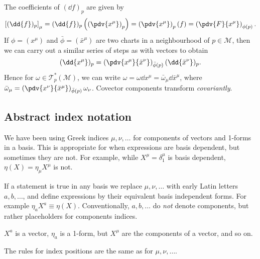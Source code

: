 \documentclass{jknotes}
\begin{document}
The coefficients of \((\dd{f})_p\) are given by
\begin{equation}
    \left[(\dd{f})_p\right]_\mu = (\dd{f})_p\left(\left(\pdv{x^\mu}\right)_p\right) = \left(\pdv{x^\mu}\right)_p(f) = \left(\pdv{F}{x^\mu}\right)_{\phi(p)}.
\end{equation}
If \(\phi=(x^\mu)\) and \(\bar\phi=(\bar{x}^\mu)\) are two charts in a neighbourhood of \(p\in \mathcal{M}\), then we can carry out a similar series of steps as with vectors to obtain
\begin{equation}
    (\dd{x^\mu})_p = \left(\pdv{x^\mu}{\bar{x}^\nu}\right)_{\bar\phi(p)}(\dd{\bar{x}^\nu})_p.
\end{equation}
Hence for \(\omega \in \mathcal{T}_p^*(\mathcal{M})\), we can write \(\omega = \omega\dd{x^\mu} = \bar{\omega}_\mu\dd{\bar{x}^\mu}\), where \(\bar\omega_\mu = \left(\pdv{x^\nu}{\bar{x}^\mu}\right)_{\bar\phi(p)}\omega_\nu\). Covector components transform \emph{covariantly}.

\subsection{Abstract index notation}
We have been using Greek indices \(\mu,\nu,\dots\) for components of vectors and 1-forms in a basis. This is appropriate for when expressions are basis dependent, but sometimes they are not. For example, while \(X^\mu = \delta_1^\mu\) is basis dependent, \(\eta(X) = \eta_\mu X^\mu\) is not. 

If a statement is true in any basis we replace \(\mu,\nu,\dots\) with early Latin letters \(a,b,\dots\), and define expressions by their equivalent basis independent forms. For example \(\eta_aX^a \equiv \eta(X)\). Conventionally, \(a,b,\dots\) do \emph{not} denote components, but rather placeholders for components indices. 

\(X^a\) is a vector, \(\eta_a\) is a 1-form, but \(X^\mu\) are the components of a vector, and so on.

The rules for index positions are the same as for \(\mu,\nu,\dots\).
\end{document}
